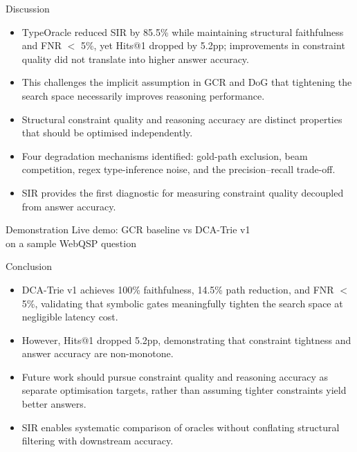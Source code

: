 \documentclass{beamer}
\begin{document}
\begin{frame}{Discussion}
  \begin{itemize}
    \item TypeOracle reduced SIR by 85.5\% while maintaining structural faithfulness and FNR $<$ 5\%, yet Hits@1 dropped by 5.2pp; improvements in constraint quality did not translate into higher answer accuracy.
    \vspace{0.3cm}
    \item This challenges the implicit assumption in GCR and DoG that tightening the search space necessarily improves reasoning performance.
    \vspace{0.3cm}
    \item Structural constraint quality and reasoning accuracy are distinct properties that should be optimised independently.
    \vspace{0.3cm}
    \item Four degradation mechanisms identified: gold-path exclusion, beam competition, regex type-inference noise, and the precision--recall trade-off.
    \vspace{0.3cm}
    \item SIR provides the first diagnostic for measuring constraint quality decoupled from answer accuracy.
  \end{itemize}
\end{frame}

\begin{frame}{Demonstration}
\centering
  Live demo: GCR baseline vs DCA-Trie v1 \\
  on a sample WebQSP question
\end{frame}

\begin{frame}{Conclusion}
  \begin{itemize}
    \item DCA-Trie v1 achieves 100\% faithfulness, 14.5\% path reduction, and FNR $<$ 5\%, validating that symbolic gates meaningfully tighten the search space at negligible latency cost.
    \vspace{0.3cm}
    \item However, Hits@1 dropped 5.2pp, demonstrating that constraint tightness and answer accuracy are non-monotone.
    \vspace{0.3cm}
    \item Future work should pursue constraint quality and reasoning accuracy as separate optimisation targets, rather than assuming tighter constraints yield better answers.
    \vspace{0.3cm}
    \item SIR enables systematic comparison of oracles without conflating structural filtering with downstream accuracy.
  \end{itemize}
\end{frame}
\end{document}
